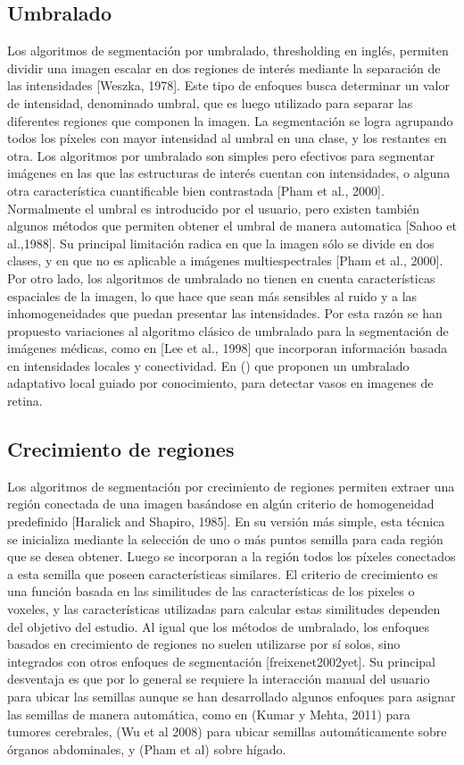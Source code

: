 \subsection{Umbralado}
Los algoritmos de segmentación por umbralado,  thresholding en inglés, permiten dividir una imagen escalar en dos regiones de interés mediante la separación de las intensidades [Weszka, 1978]. Este tipo de enfoques busca determinar un valor de intensidad, denominado umbral, que es luego utilizado para separar las diferentes regiones que componen la imagen. La segmentación se logra agrupando todos los píxeles con mayor intensidad al umbral en una clase, y los restantes en otra. 
Los algoritmos por umbralado son simples pero efectivos para segmentar imágenes en las que las estructuras de interés cuentan con intensidades, o alguna otra característica cuantificable bien contrastada [Pham et al., 2000]. Normalmente el umbral es introducido por el usuario, pero existen también algunos métodos que permiten obtener el umbral de manera automatica [Sahoo et al.,1988]. 
Su principal limitación radica en que la imagen sólo se divide en dos clases, y en que no es aplicable a imágenes multiespectrales [Pham et al., 2000]. Por otro lado, los algoritmos de umbralado no tienen en cuenta características espaciales de la imagen, lo que hace que sean más sensibles al ruido y a las inhomogeneidades que puedan presentar las intensidades. Por esta razón se han propuesto variaciones al algoritmo clásico de umbralado para la segmentación de imágenes médicas, como en [Lee et al., 1998] que incorporan información basada en intensidades locales y conectividad. En () que proponen un umbralado adaptativo local guiado por conocimiento, para detectar vasos en imagenes de retina.

\subsection{Crecimiento de regiones}
Los algoritmos de segmentación por crecimiento de regiones permiten extraer una región conectada de una imagen basándose en algún criterio de homogeneidad predefinido [Haralick and Shapiro, 1985]. 
En su versión más simple, esta técnica se inicializa mediante la selección de uno o más puntos semilla para cada región que se desea obtener. Luego se incorporan a la región todos los píxeles conectados a esta semilla que poseen características similares. El criterio de crecimiento es una función basada en las similitudes de las características de los pixeles o voxeles, y las características utilizadas para calcular estas similitudes dependen del objetivo del estudio.
Al igual que los métodos de umbralado, los enfoques basados en crecimiento de regiones no suelen utilizarse por sí solos, sino integrados con otros enfoques de segmentación [freixenet2002yet]. Su principal desventaja es que por lo general se requiere la interacción manual del usuario para ubicar las semillas aunque se han desarrollado algunos enfoques para asignar las semillas de manera automática, como en (Kumar y Mehta, 2011) para tumores cerebrales, (Wu et al 2008) para ubicar semillas automáticamente sobre órganos abdominales, y (Pham et al) sobre hígado.

